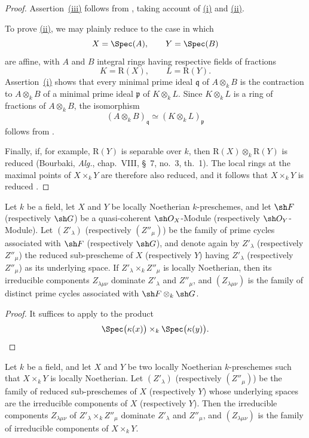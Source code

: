 \begin{proof}
Assertion~\hyperref[IV.4.2.4.iii]{(iii)} follows from
, taking account of
\hyperref[IV.4.2.4.i]{(i)} and \hyperref[IV.4.2.4.ii]{(ii)}.

To prove \hyperref[IV.4.2.4.ii]{(ii)}, we may plainly reduce to the case
in which
\[
X=\Spec(A),
\qquad
Y=\Spec(B)
\]
are affine, with $A$ and $B$ integral rings having respective fields of
fractions
\[
K=\mathrm R(X),
\qquad
L=\mathrm R(Y).
\]
Assertion~\hyperref[IV.4.2.4.i]{(i)} shows that every minimal prime ideal
$\mathfrak q$ of $A\otimes_k B$ is the contraction to $A\otimes_k B$
of a minimal prime ideal $\mathfrak p$ of $K\otimes_k L$.
Since $K\otimes_k L$ is a ring of fractions of $A\otimes_k B$, the
isomorphism
\[
(A\otimes_k B)_{\mathfrak q}
\simeq
(K\otimes_k L)_{\mathfrak p}
\]
follows from .

Finally, if, for example, $\mathrm R(Y)$ is separable over $k$, then
$\mathrm R(X)\otimes_k\mathrm R(Y)$ is reduced
(Bourbaki, \emph{Alg.}, chap.~VIII, \S~7, no.~3, th.~1).
The local rings at the maximal points of $X\times_k Y$ are therefore
also reduced, and it follows that $X\times_k Y$ is reduced
.
\end{proof}

\begin{proposition}[4.2.5]
\label{IV.4.2.5}
Let $k$ be a field, let $X$ and $Y$ be locally Noetherian
$k$-preschemes, and let $\sh F$ (respectively $\sh G$) be a
quasi-coherent $\sh O_X$-Module (respectively $\sh O_Y$-Module).
Let $(Z'_\lambda)$ (respectively $(Z''_\mu)$) be the family of prime
cycles associated with $\sh F$ (respectively $\sh G$), and denote again
by $Z'_\lambda$ (respectively $Z''_\mu$) the reduced sub-prescheme of
$X$ (respectively $Y$) having $Z'_\lambda$ (respectively $Z''_\mu$) as
its underlying space.
If $Z'_\lambda\times_k Z''_\mu$ is locally Noetherian, then its
irreducible components $Z_{\lambda\mu\nu}$ dominate $Z'_\lambda$ and
$Z''_\mu$, and $(Z_{\lambda\mu\nu})$ is the family of distinct prime
cycles associated with $\sh F\otimes_k\sh G$.
\end{proposition}

\begin{proof}
It suffices to apply  to the product
\[
\Spec\bigl(\kappa(x)\bigr)\times_k\Spec\bigl(\kappa(y)\bigr).
\]
\end{proof}

\begin{corollary}[4.2.6]
\label{IV.4.2.6}
Let $k$ be a field, and let $X$ and $Y$ be two locally Noetherian
$k$-preschemes such that $X\times_k Y$ is locally Noetherian.
Let $(Z'_\lambda)$ (respectively $(Z''_\mu)$) be the family of reduced
sub-preschemes of $X$ (respectively $Y$) whose underlying spaces are
the irreducible components of $X$ (respectively $Y$).
Then the irreducible components $Z_{\lambda\mu\nu}$ of
$Z'_\lambda\times_k Z''_\mu$ dominate $Z'_\lambda$ and $Z''_\mu$, and
$(Z_{\lambda\mu\nu})$ is the family of irreducible components of
$X\times_k Y$.
\end{corollary}

